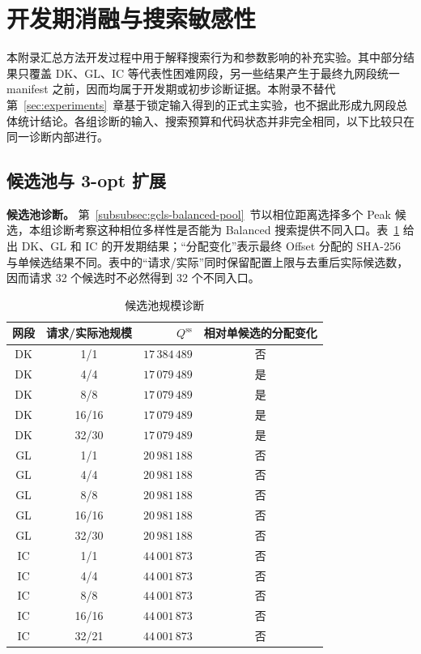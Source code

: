 \documentclass[UTF8,a4paper,twoside,zihao=-4]{ctexart}
\numberwithin{equation}{section}
\numberwithin{figure}{section}
\numberwithin{table}{section}
\theoremstyle{definition}
\numberwithin{algocf}{section}
\begin{document}
\clearpage
\section{开发期消融与搜索敏感性}
\label{sec:appendix-diagnostics}

本附录汇总方法开发过程中用于解释搜索行为和参数影响的补充实验。其中部分结果只覆盖 DK、GL、IC 等代表性困难网段，另一些结果产生于最终九网段统一 manifest 之前，因而均属于开发期或初步诊断证据。本附录不替代第~\ref{sec:experiments}~章基于锁定输入得到的正式主实验，也不据此形成九网段总体统计结论。各组诊断的输入、搜索预算和代码状态并非完全相同，以下比较只在同一诊断内部进行。

\subsection{候选池与 3-opt 扩展}
\label{subsec:appendix-pool-triple}

\noindent\textbf{候选池诊断。}
第~\ref{subsubsec:gcls-balanced-pool}~节以相位距离选择多个 Peak 候选，本组诊断考察这种相位多样性是否能为 Balanced 搜索提供不同入口。表~\ref{tab:appendix-candidate-pool} 给出 DK、GL 和 IC 的开发期结果；“分配变化”表示最终 Offset 分配的 SHA-256 与单候选结果不同。表中的“请求/实际”同时保留配置上限与去重后实际候选数，因而请求 32 个候选时不必然得到 32 个不同入口。

\begin{table}[htbp]
\centering
\small
\caption{候选池规模诊断}
\label{tab:appendix-candidate-pool}
\begin{tabular}{@{}ccrc@{}}
\toprule
网段 & 请求/实际池规模 & $Q^{\mathrm{ss}}$ & 相对单候选的分配变化 \\
\midrule
DK & 1/1   & $17\,384\,489$ & 否 \\
DK & 4/4   & $17\,079\,489$ & 是 \\
DK & 8/8   & $17\,079\,489$ & 是 \\
DK & 16/16 & $17\,079\,489$ & 是 \\
DK & 32/30 & $17\,079\,489$ & 是 \\
\addlinespace
GL & 1/1   & $20\,981\,188$ & 否 \\
GL & 4/4   & $20\,981\,188$ & 否 \\
GL & 8/8   & $20\,981\,188$ & 否 \\
GL & 16/16 & $20\,981\,188$ & 否 \\
GL & 32/30 & $20\,981\,188$ & 否 \\
\addlinespace
IC & 1/1   & $44\,001\,873$ & 否 \\
IC & 4/4   & $44\,001\,873$ & 否 \\
IC & 8/8   & $44\,001\,873$ & 否 \\
IC & 16/16 & $44\,001\,873$ & 否 \\
IC & 32/21 & $44\,001\,873$ & 否 \\
\bottomrule
\end{tabular}
\end{table}
\end{document}

